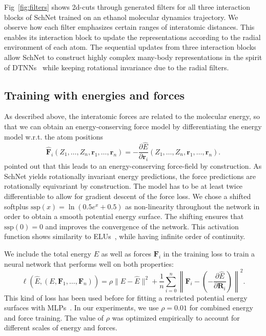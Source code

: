 \documentclass{article}
\newcommand{\R}{\mathbf{R}}
\newcommand{\rr}{\mathbf{r}}
\begin{document}
Fig~\ref{fig:filters} shows 2d-cuts through generated filters for all three interaction blocks of SchNet trained on an ethanol molecular dynamics trajectory.
We observe how each filter emphasizes certain ranges of interatomic distances.
This enables its interaction block to update the representations according to the radial environment of each atom.
The sequential updates from three interaction blocks allow SchNet to construct highly complex many-body representations in the spirit of DTNNs~\citep{schutt2017quantum} while keeping rotational invariance due to the radial filters.



\subsection{Training with energies and forces}
As described above, the interatomic forces are related to the molecular energy, so that we can obtain an energy-conserving force model by differentiating the energy model w.r.t. the atom positions
\begin{equation}
\hat{\textbf{F}}_i(Z_1, \dots, Z_n, \rr_1, \dots, \rr_n) = -\frac{\partial \hat{E}}{\partial \rr_i}(Z_1, \dots, Z_n, \rr_1, \dots, \rr_n).
\end{equation}
\citet{chmiela2017machine} pointed out that this leads to an energy-conserving force-field by construction.
As SchNet yields rotationally invariant energy predictions, the force predictions are rotationally equivariant by construction.
The model has to be at least twice differentiable to allow for gradient descent of the force loss.
We chose a shifted softplus $\text{ssp}(x) = \ln(0.5e^x + 0.5)$ as non-linearity throughout the network in order to obtain a smooth potential energy surface.
The shifting ensures that $\text{ssp}(0) = 0$ and improves the convergence of the network.
This activation function shows similarity to ELUs~\citep{clevert2015fast}, while having infinite order of continuity.

We include the total energy $E$ as well as forces $\mathbf{F}_i$ in the training loss to train a neural network that performs well on both properties:
\begin{equation}
\ell(\hat{E}, (E, \mathbf{F}_1, \dots, \mathbf{F}_n)) = \rho \|E - \hat{E} \|^2 + \frac{1}{n} \sum_{i=0}^n \left \| \mathbf{F}_i - \left (-\frac{\partial \hat{E}}{\partial \R_i}\right ) \right\|^2. \label{eq:loss}
\end{equation}
This kind of loss has been used before for fitting a restricted potential energy surfaces with MLPs~\citep{pukrittayakamee2009simultaneous}.
In our experiments, we use $\rho=0.01$ for combined energy and force training. The value of $\rho$ was optimized empirically to account for different scales of energy and forces.
\end{document}
